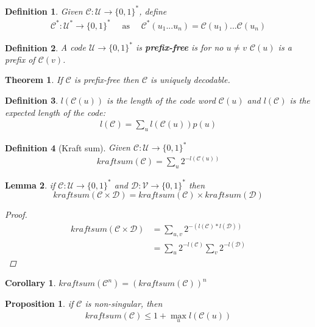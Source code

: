 \documentclass[twoside]{article}
\newtheorem{theorem}{Theorem}[section]
\newtheorem{corollary}{Corollary}[theorem]
\newtheorem{lemma}[theorem]{Lemma}
\newtheorem{definition}{Definition}[section]
\newtheorem{proposition}{Proposition}[section]
\theoremstyle{definition} %
\def\D{\mathcal{D}}
\def\V{\mathcal{V}}
\def\U{\mathcal{U}}
\def\C{\mathcal{C}}
\begin{document}
\begin{definition}
	Given $\C : \U \rightarrow \{ 0, 1\}^*$, define
	\begin{align*}
		\C^* : \U^* \rightarrow \{0, 1\}^*
		\quad \text{ as } \quad
		\C^*(u_1 ... u_n) = \C(u_1)...\C(u_n)
	\end{align*}
\end{definition}

\begin{definition}
	A code $\U \rightarrow \{0, 1\}^*$ is \textbf{prefix-free} is for no $u \neq v$ $\C(u)$ is a prefix of $\C(v)$.
\end{definition}

\begin{theorem}
	If $\C$ is prefix-free then $\C$ is uniquely decodable.
\end{theorem}

\begin{definition}
  $l(\C(u))$ is the length of the code word $\C(u)$ and $l(\C)$ is the expected length of the code:
  \begin{align*}
    l(\C) = \sum_u l(\C(u)) p(u)
  \end{align*}
\end{definition}

\begin{definition}[Kraft sum]
  Given $\C : \U \rightarrow \{ 0, 1\}^*$
	\begin{align*}
		kraftsum(\C) = \sum_u 2^{-l(\C(u))}
	\end{align*}
\end{definition}

\begin{lemma}
	if $\C : \U \rightarrow \{ 0, 1\}^*$ and $\D : \V \rightarrow \{ 0, 1\}^*$
	then
  $$kraftsum(\C \times \D) = kraftsum(\C) \times kraftsum(\D)$$
	\begin{proof}
    \begin{align*}
      kraftsum(\C \times \D) &= \sum_{u, v} 2^{-(l(\C) * l(\D))} \\
      &= \sum_u 2^{-l(\C)} \sum_v 2^{- l(\D)}
    \end{align*}
	\end{proof}
\end{lemma}

\begin{corollary}
  $kraftsum(\C^n) = (kraftsum(\C))^n$
\end{corollary}

\begin{proposition}
  if $\C$ is non-singular, then
  \begin{align*}
    kraftsum(\C) \leq 1 + \max_u l(\C(u))
  \end{align*}
\end{proposition}
\end{document}
